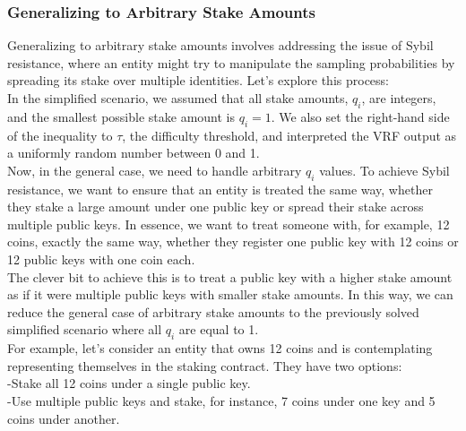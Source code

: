 \subsubsection{Generalizing to Arbitrary Stake Amounts}
Generalizing to arbitrary stake amounts involves addressing the issue of Sybil resistance, where an entity might try to manipulate the sampling probabilities by spreading its stake over multiple identities. Let's explore this process:\\
In the simplified scenario, we assumed that all stake amounts, $q_i$, are integers, and the smallest possible stake amount is $q_i = 1$. We also set the right-hand side of the inequality to $\tau$, the difficulty threshold, and interpreted the VRF output as a uniformly random number between 0 and 1.\\
Now, in the general case, we need to handle arbitrary $q_i$ values. To achieve Sybil resistance, we want to ensure that an entity is treated the same way, whether they stake a large amount under one public key or spread their stake across multiple public keys. In essence, we want to treat someone with, for example, 12 coins, exactly the same way, whether they register one public key with 12 coins or 12 public keys with one coin each.\\
The clever bit to achieve this is to treat a public key with a higher stake amount as if it were multiple public keys with smaller stake amounts. In this way, we can reduce the general case of arbitrary stake amounts to the previously solved simplified scenario where all $q_i$ are equal to 1.\\
For example, let's consider an entity that owns 12 coins and is contemplating representing themselves in the staking contract. They have two options:\\
-Stake all 12 coins under a single public key.\\
-Use multiple public keys and stake, for instance, 7 coins under one key and 5 coins under another.\\

